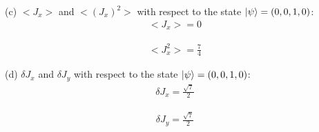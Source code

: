 \documentclass[10pt,a4paper]{article}
\begin{document}
(c) $<J_x>$ and $<(J_x)^2>$ with respect to the state $\Ket{\psi} = (0, 0, 1, 0)$:\begin{align}
<J_x> = 0 &\end{align}

\begin{align}
<J_x^2> = \frac{7}{4} &\end{align}

(d) $\delta J_x$ and $\delta J_y$ with respect to the state $\Ket{\psi} = (0, 0, 1, 0)$:\begin{align}
 \delta J_x = \frac{\sqrt{7}}{2} &\end{align}

\begin{align}
 \delta J_y = \frac{\sqrt{7}}{2} &\end{align}
\end{document}
